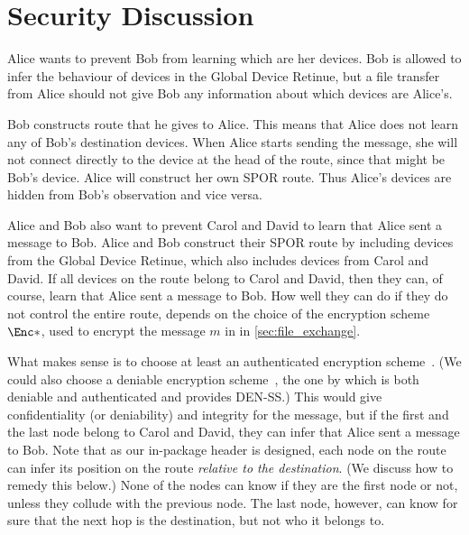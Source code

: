 \section{Security Discussion}%
\label{SecurityDiscussion}

Alice wants to prevent Bob from learning which are her devices.
Bob is allowed to infer the behaviour of devices in the Global Device Retinue, 
but a file transfer from Alice should not give Bob any information about which 
devices are Alice's.

Bob constructs \name route that he gives to Alice.
This means that Alice does not learn any of Bob's destination devices.
When Alice starts sending the message, she will not connect directly to the 
device at the head of the route, since that might be Bob's device.
Alice will construct her own \ac{SPOR} route.
Thus Alice's devices are hidden from Bob's observation and vice versa.

Alice and Bob also want to prevent Carol and David to learn that Alice sent a 
message to Bob.
Alice and Bob construct their \ac{SPOR} route by including devices from the 
Global Device Retinue, which also includes devices from Carol and David.
If all devices on the route belong to Carol and David, then they can, of course, 
learn that Alice sent a message to Bob.
How well they can do if they do not control the entire route, depends on the 
choice of the encryption scheme \(\Enc*\), used to encrypt the message \(m\) in 
in \cref{sec:file_exchange}.

What makes sense is to choose at least an authenticated encryption 
scheme~\cite{AuthEncryption}.
(We could also choose a deniable encryption scheme~\cite{DeniableEncryption}, 
\eg the one by \textcite{OTPKX} which is both deniable and authenticated and 
provides \ac{DEN-SS}.)
This would give confidentiality (or deniability) and integrity for the message, 
but if the first and the last node belong to Carol and David, they can infer 
that Alice sent a message to Bob.
Note that as our in-package header is designed, each node on the route can infer 
its position on the route \emph{relative to the destination}.
(We discuss how to remedy this below.)
None of the nodes can know if they are the first node or not, unless they 
collude with the previous node.
The last node, however, can know for sure that the next hop is the destination, 
but not who it belongs to.

